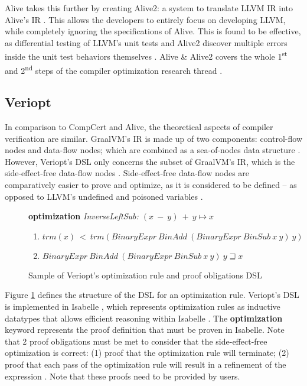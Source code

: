 Alive takes this further by creating Alive2: a system to translate LLVM IR into Alive's IR \cite{Alive2}. This allows the developers to entirely 
focus on developing LLVM, while completely ignoring the specifications of Alive. This is found to be effective, as differential testing of 
LLVM's unit tests and Alive2 discover multiple errors inside the unit test behaviors themselves \cite[Sec. 8.2]{Alive2}. Alive \& Alive2 covers 
the whole 1\textsuperscript{st} and 2\textsuperscript{nd} steps of the compiler optimization research thread \cite[p. 5]{CompilerOptimization}.

\subsection{Veriopt}
\label{sec:Veriopt}

In comparison to CompCert and Alive, the theoretical aspects of compiler verification are similar. GraalVM's IR is made up of two components: 
control-flow nodes and data-flow nodes; which are combined as a sea-of-nodes data structure \cite{ATVA21_GraalVM_IR_Semantics}. However, 
Veriopt's DSL only concerns the subset of GraalVM's IR, which is the side-effect-free data-flow nodes \cite{Term_Graph_Optimizations}.
Side-effect-free data-flow nodes are comparatively easier to prove and optimize, as it is considered to be defined -- as opposed to LLVM's undefined 
and poisoned variables \cite{Alive2}.

\begin{figure}[!htb]
    \textbf{optimization} \emph{InverseLeftSub: \((x\ -\ y)\ +\ y \longmapsto x\)}
    \begin{enumerate}
        \item \(trm(x)\ <\ trm(BinaryExpr\ BinAdd\ (BinaryExpr\ BinSub\ x\ y)\ y)\)
        \item \(BinaryExpr\ BinAdd\ (BinaryExpr\ BinSub\ x\ y)\ y \sqsupseteq x\)
    \end{enumerate}

    \caption{Sample of Veriopt's optimization rule and proof obligations DSL \cite[Fig. 3]{Term_Graph_Optimizations}}
    \label{fig:VerioptDSLSample}
\end{figure}

Figure \ref{fig:VerioptDSLSample} defines the structure of the DSL for an optimization rule. Veriopt's DSL is implemented in Isabelle 
\cite{IsabelleHOL}, which represents optimization rules as inductive datatypes that allows efficient reasoning within Isabelle 
\cite[Sec. 3]{ATVA21_GraalVM_IR_Semantics} \cite{biendarra_ning_2024}. 
The \textbf{optimization} keyword represents the proof definition that must be proven in Isabelle. 
Note that 2 proof obligations must be met to consider that the side-effect-free optimization is correct: 
(1) proof that the optimization rule will terminate; (2) proof that each pass of the optimization rule will 
result in a refinement of the expression \cite{Term_Graph_Optimizations}. Note that these proofs need to be provided by users.

